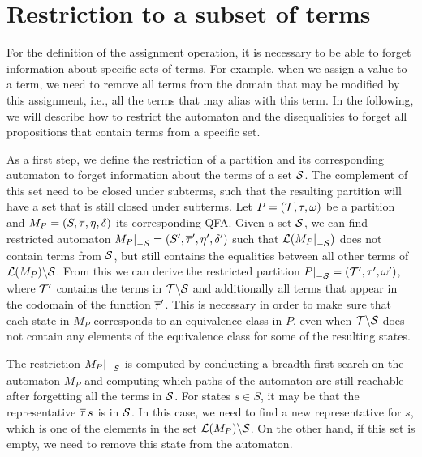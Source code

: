 \section{Restriction to a subset of terms}

For the definition of the assignment operation, it is necessary to be able to forget information about specific sets of terms.
For example, when we assign a value to a term, we need to remove all terms from the domain that may be modified by this assignment, i.e., all the terms that may alias with this term.
In the following, we will describe how to restrict the automaton and the disequalities to forget all propositions that contain terms from a specific set.

As a first step, we define the restriction of a partition and its corresponding automaton to forget information about the terms of a set $\mathcal{S}$.
The complement of this set need to be closed under subterms, such that the
resulting partition will have a set that is still closed under subterms. 
Let $P = (\mathcal{T}, \tau, \omega)$ be a partition and $M_P = (S, \overline{\tau}, \eta, \delta)$ its corresponding QFA.\@
Given a set $\mathcal{S}$, we can find restricted
automaton $\restr{M_P}{-\Set} = (S', \otau', \eta', \delta')$ such that $\L(\restr{M_P}{-\Set})$ does not contain terms from
$\mathcal{S}$, but still contains the equalities between all other terms of $\mathcal{L}(M_P) \backslash \mathcal{S}$.
From this we can derive the restricted partition $\restr{P}{-\Set} = (\T', \tau', \omega')$, where $\mathcal{T}'$ contains
the terms in $\mathcal{T} \backslash \mathcal{S}$ and additionally all terms that appear in the codomain of the function $\overline{\tau}'$.
This is necessary in order to make sure that each state in $M_P$ corresponds to an equivalence class in $P$,
even when $\mathcal{T} \backslash \mathcal{S}$ does not contain any elements of the equivalence class for some of the resulting states.

\begin{example}
\end{example}

The restriction $\restr{M_P}{-\Set}$ is computed by conducting a breadth-first search on the automaton $M_P$
and computing which paths of the automaton are still reachable after forgetting all the terms in $\mathcal{S}$.
For states $s \in S$, it may be that the representative $\overline{\tau}\,s$ is in $\mathcal{S}$.
In this case, we need to find a new representative for $s$, which is one of the elements in the set
$\mathcal{L}(M_P) \backslash \mathcal{S}$. On the other hand, if this set is empty,
we need to remove this state from the automaton.

